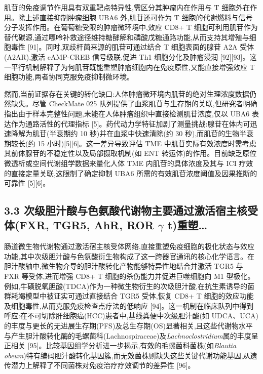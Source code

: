 肌苷的免疫调节作用具有双重靶点特异性,需区分其肿瘤内在作用与 T 细胞外在作用。除上述直接抑制肿瘤细胞 UBA6 外,肌苷还可作为 T 细胞的代谢燃料与信号分子发挥作用。在葡萄糖受限的肿瘤微环境中,效应 CD8+ T 细胞可利用肌苷作为替代碳源,通过嘌呤补救途径维持糖酵解和磷酸戊糖通路功能,从而支持其增殖与细胞毒性 {[}91{]}。同时,双歧杆菌来源的肌苷可通过结合 T 细胞表面的腺苷 A2A 受体(A2AR),激活 cAMP-CREB 信号级联,促进 Th1 细胞分化及肿瘤浸润 {[}92{]}{[}93{]}。这一平行机制解释了为何肌苷既能重塑肿瘤细胞内在免疫原性,又能直接增强效应 T 细胞功能,两者协同克服免疫抑制微环境。

然而,当前证据存在关键的转化缺口:人体肿瘤微环境内肌苷的绝对生理浓度数据仍然缺失。尽管 CheckMate 025 队列提供了血浆肌苷与生存期的关联,但研究者明确指出由于样本完整性问题,未能在人体肿瘤组织中直接检测肌苷浓度,仅以 UBA6 表达作为通路活性的代理指标 {[}5{]}。药代动力学特征加剧了测量挑战:腺苷在体内可迅速降解为肌苷(半衰期约 10 秒)并在血浆中快速清除(约 30 秒),而肌苷的生物半衰期较长(约 15 小时){[}5{]}{[}6{]}。这一差异导致评估 TME 中肌苷实际有效浓度时需考虑其前体腺苷的不稳定性以及局部摄取机制(如 ENT 转运体)的作用。目前缺乏原位微透析或空间代谢组学数据来量化人体 TME 内肌苷的具体浓度及其与 ICI 疗效的直接定量关联,这限制了确定抑制 UBA6 所需的有效肌苷浓度阈值及因果推断的可靠性 {[}5{]}{[}6{]}。

\subsection{\texorpdfstring{3.3 次级胆汁酸与色氨酸代谢物主要通过激活宿主核受体(FXR, TGR5, AhR, ROR \(\gamma\) t)重塑\ldots{}}{3.3 次级胆汁酸与色氨酸代谢物主要通过激活宿主核受体(FXR, TGR5, AhR, ROR \textbackslash gamma t)重塑\ldots{}}}\label{ux6b21ux7ea7ux80c6ux6c41ux9178ux4e0eux8272ux6c28ux9178ux4ee3ux8c22ux7269ux4e3bux8981ux901aux8fc7ux6fc0ux6d3bux5bbfux4e3bux6838ux53d7ux4f53fxr-tgr5-ahr-ror-gamma-tux91cdux5851}

肠道微生物代谢物通过激活宿主核受体网络,直接重塑免疫细胞的极化状态与效应功能,其中次级胆汁酸与色氨酸衍生物构成了这一跨器官通讯的核心化学语言。在胆汁酸轴中,微生物介导的胆汁酸转化产物能够特异性地结合并激活 TGR5 与 FXR 等受体,进而增强 CD8+ T 细胞的杀伤能力并促进巨噬细胞向 M1 型极化。例如,牛磺脱氧胆酸(TDCA)作为一种微生物衍生的次级胆汁酸,在抗生素诱导的菌群耗竭模型中被证实可通过直接结合 TGR5 受体,恢复 CD8+ T 细胞的效应功能及细胞毒性,从而克服免疫检查点疗法的低响应 {[}94{]}。这一机制在临床队列中得到呼应:在不可切除肝细胞癌(HCC)患者中,基线粪便中次级胆汁酸(如 UDCA、UCA)的丰度与更长的无进展生存期(PFS)及总生存期(OS)显著相关,且这些代谢物水平与产生胆汁酸转化酶的毛螺菌科(Lachnospiraceae)及\emph{Lachnoclostridium}属的丰度呈正相关 {[}95{]}。比较基因组学分析进一步揭示,有效的毛螺菌科菌株(如\emph{Blautia obeum})特有编码胆汁酸转化基因簇,而无效菌株则缺失这些关键代谢功能基因,从遗传潜力上解释了不同菌株对免疫治疗疗效调节的差异性 {[}96{]}。

